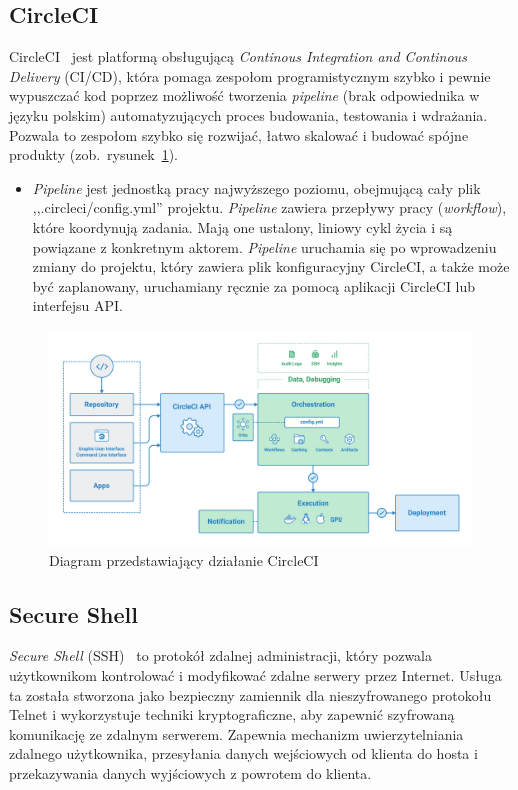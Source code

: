 	\subsection{CircleCI}
	CircleCI~\cite{circleci} jest platformą obsługującą \textit{Continous Integration and Continous Delivery} (CI/CD), która pomaga zespołom programistycznym szybko i pewnie wypuszczać kod poprzez możliwość tworzenia \textit{pipeline} (brak odpowiednika w języku polskim) automatyzujących proces budowania, testowania i wdrażania. Pozwala to zespołom szybko się rozwijać, łatwo skalować i budować spójne produkty (zob.~rysunek~\ref{rys:circleci_diagram}).
	\begin{itemize}
	\item \textit{Pipeline} jest jednostką pracy najwyższego poziomu, obejmującą cały plik ,,.circleci/config.yml'' projektu. \textit{Pipeline} zawiera przepływy pracy (\textit{workflow}), które koordynują zadania. Mają one ustalony, liniowy cykl życia i są powiązane z konkretnym aktorem. \textit{Pipeline} uruchamia się po wprowadzeniu zmiany do projektu, który zawiera plik konfiguracyjny CircleCI, a także może być zaplanowany, uruchamiany ręcznie za pomocą aplikacji CircleCI lub interfejsu API.
	\end{itemize}
\begin{figure}[H]
\centering\includegraphics[width=\textwidth]{figures/circleci_schema}
\caption{Diagram przedstawiający działanie CircleCI~\cite{circleci_schema}}\label{rys:circleci_diagram}
\end{figure}

	\subsection{Secure Shell}
	\textit{Secure Shell} (SSH)~\cite{ssh} to protokół zdalnej administracji, który pozwala użytkownikom kontrolować i modyfikować zdalne serwery przez Internet. Usługa ta została stworzona jako bezpieczny zamiennik dla nieszyfrowanego protokołu Telnet i wykorzystuje techniki kryptograficzne, aby zapewnić szyfrowaną komunikację ze zdalnym serwerem. Zapewnia mechanizm uwierzytelniania zdalnego użytkownika, przesyłania danych wejściowych od klienta do hosta i przekazywania danych wyjściowych z powrotem do klienta.
	
